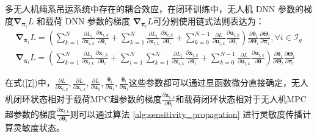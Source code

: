 \documentclass[lang=chs, degree=master, blindreview=true, winfonts=true]{yanputhesis}
\begin{document}
多无人机绳系吊运系统中存在的耦合效应，在闭环训练中，无人机 DNN 参数的梯度\( \bm{\nabla}_ {\bm \pi_i}  L \) 和载荷 DNN 参数的梯度 \( \bm{\nabla}_ {\bm \pi_l}  L \)可分别使用链式法则表达为：
\begin{equation}
	\begin{gathered}
		\bm{\nabla}_ {\bm \pi_i}  L = \left(\sum_{k=1}^{N} \frac{\partial L_i}{\partial \bm x_{i,k}} \frac{\partial \bm x_{i,k}}{\partial \bm \theta_i} + \sum_{k=1}^{N} \frac{\partial L_l}{\partial \bm x_{l,k}} \frac{\partial \bm x_{l,k}}{\partial \bm \theta_i} +\sum_{k=0}^{N-1} \frac{\partial L}{\partial \bm u_{i,k}} \frac{\partial \bm u_{i,k}}{\partial \bm \theta_i}\right)\frac{\partial\boldsymbol{\theta}_{i}}{\partial\boldsymbol{\Theta}_{i}}\frac{\partial\boldsymbol{\Theta}_{i}}{\partial\boldsymbol{\pi}_{i}},\forall i\in\mathcal{I}_q\\
		\bm{\nabla}_ {\bm \pi_l} L = \left(\sum_{k=1}^{N} \frac{\partial L_l}{\partial \bm x_{l,k}} \frac{\partial \bm x_{l,k}}{\partial \bm \theta_l} +\sum_{i=1}^{N} \sum_{k=1}^{N} \frac{\partial L_i}{\partial \bm x_{i,k}} \frac{\partial \bm x_{i,k}}{\partial \bm \theta_l} + \sum_{k=0}^{N-1} \frac{\partial L}{\partial \bm u_{l,k}} \frac{\partial \bm u_{l,k}}{\partial \bm \theta}\right)\frac{\partial\boldsymbol{\theta}_{l}}{\partial\boldsymbol{\Theta}_{l}}\frac{\partial\boldsymbol{\Theta}_{l}}{\partial\boldsymbol{\pi}_{l}}
	\end{gathered}
	\label{7}
\end{equation}

在式(\ref{7})中，$\frac{\partial L}{\partial \bm x_{i,k}} , \frac{\partial L}{\partial \bm x_{l,k}} , \frac{\partial L}{\partial \bm u_k} , \frac{\boldsymbol{\theta}_i}{\partial\boldsymbol{\pi}_i} , \frac{\boldsymbol{\theta}_l}{\partial\boldsymbol{\pi}_l}$这些参数都可以通过显函数微分直接确定，无人机闭环状态相对于载荷MPC超参数的梯度\(\frac{\partial \bm x_{i,k}}{\partial \bm \theta_l}\)和载荷闭环状态相对于无人机MPC超参数的梯度\(\frac{\partial \bm x_{l,k}}{\partial \bm \theta_i}\)则可以通过算法 \ref{alg:sensitivity_propagation} 进行灵敏度传播计算灵敏度状态。
\end{document}
